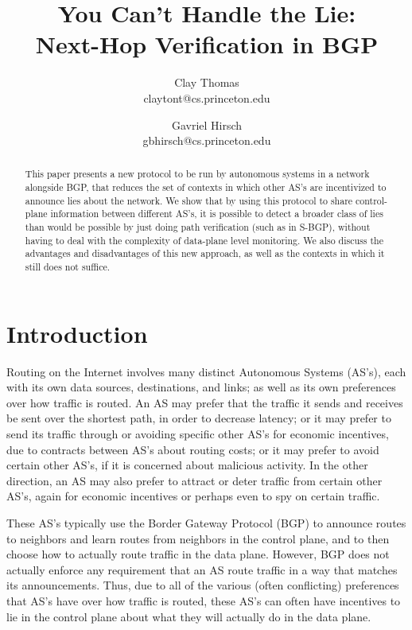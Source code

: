 \documentclass[12pt]{article}
\begin{document}

\title{
  You Can't Handle the Lie: \\
  Next-Hop Verification in BGP
}
\author{
  Clay Thomas\\ claytont@cs.princeton.edu
  \and 
  Gavriel Hirsch\\ gbhirsch@cs.princeton.edu 
}
\maketitle

\begin{abstract}
  This paper presents a new protocol to be run by autonomous systems in a network alongside BGP, that reduces the set of contexts in which other AS's are incentivized to announce lies about the network. We show that by using this protocol to share control-plane information between different AS's, it is possible to detect a broader class of lies than would be possible by just doing path verification (such as in S-BGP), without having to deal with the complexity of data-plane level monitoring. We also discuss the advantages and disadvantages of this new approach, as well as the contexts in which it still does not suffice.
\end{abstract}


\section{Introduction}
Routing on the Internet involves many distinct Autonomous Systems (AS's), each with its own data sources, destinations, and links; as well as its own preferences over how traffic is routed. An AS may prefer that the traffic it sends and receives be sent over the shortest path, in order to decrease latency; or it may prefer to send its traffic through or avoiding specific other AS's for economic incentives, due to contracts between AS's about routing costs; or it may prefer to avoid certain other AS's, if it is concerned about malicious activity. In the other direction, an AS may also prefer to attract or deter traffic from certain other AS's, again for economic incentives or perhaps even to spy on certain traffic.

These AS's typically use the Border Gateway Protocol (BGP) to announce routes to neighbors and learn routes from neighbors in the control plane, and to then choose how to actually route traffic in the data plane. However, BGP does not actually enforce any requirement that an AS route traffic in a way that matches its announcements. Thus, due to all of the various (often conflicting) preferences that AS's have over how traffic is routed, these AS's can often have incentives to lie in the control plane about what they will actually do in the data plane.
\end{document}
